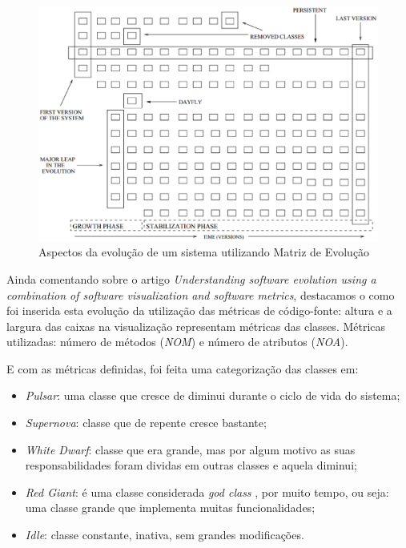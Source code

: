 \begin{figure}[!htb]
  \centering
    \includegraphics[keepaspectratio=true,scale=0.5]
    {figuras/evolutionMatrixAspects.eps}
  \caption{Aspectos da evolução de um sistema utilizando Matriz de Evolução
  \cite{Lanza02understandingsoftware}}
  \label{fig:evolutionMatrixAspects}
\end{figure}


Ainda comentando sobre o artigo \textit{Understanding software evolution using
a combination of software visualization and software metrics}, destacamos o
como foi inserida esta evolução da utilização das métricas de código-fonte:
altura e a largura das caixas na visualização representam métricas das
classes. Métricas utilizadas: número de métodos (\textit{NOM}) e número de
atributos (\textit{NOA}).

E com as métricas definidas, foi feita uma categorização das classes em:

\begin{itemize}
  \item \textit{Pulsar}: uma classe que cresce de diminui durante o ciclo de
  vida do sistema;
  \item \textit{Supernova}: classe que de repente cresce bastante;
  \item \textit{White Dwarf}: classe que era grande, mas por algum motivo as
  suas responsabilidades foram dividas em outras classes e aquela diminui;
  \item \textit{Red Giant}: é uma classe considerada \textit{god class}
  \cite{riel1996object}, por muito tempo, ou seja: uma classe grande que
  implementa muitas funcionalidades;
  \item \textit{Idle}: classe constante, inativa, sem grandes modificações.
\end{itemize}

